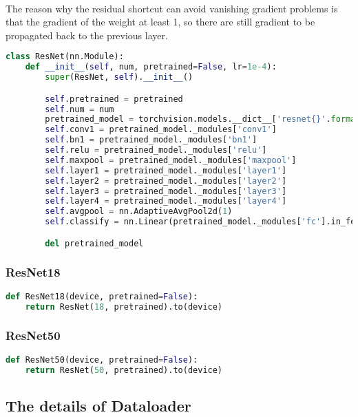 \paragraph{}
The reason why the residual shortcut can avoid vanishing gradient problems is that the gradient of the weight at least 1, so there are still gradient to be propagated back to the previous layer. 
\begin{lstlisting}[language=Python]
class ResNet(nn.Module):
    def __init__(self, num, pretrained=False, lr=1e-4):
        super(ResNet, self).__init__()

        self.pretrained = pretrained
        self.num = num
        pretrained_model = torchvision.models.__dict__['resnet{}'.format(num)](pretrained=pretrained)
        self.conv1 = pretrained_model._modules['conv1']
        self.bn1 = pretrained_model._modules['bn1']
        self.relu = pretrained_model._modules['relu']
        self.maxpool = pretrained_model._modules['maxpool']
        self.layer1 = pretrained_model._modules['layer1']
        self.layer2 = pretrained_model._modules['layer2']
        self.layer3 = pretrained_model._modules['layer3']
        self.layer4 = pretrained_model._modules['layer4']
        self.avgpool = nn.AdaptiveAvgPool2d(1)
        self.classify = nn.Linear(pretrained_model._modules['fc'].in_features, 5)

        del pretrained_model
\end{lstlisting}
\subsubsection{ResNet18}
\begin{lstlisting}[language=Python]
def ResNet18(device, pretrained=False):
    return ResNet(18, pretrained).to(device)
\end{lstlisting}
\subsubsection{ResNet50}
\begin{lstlisting}[language=Python]
def ResNet50(device, pretrained=False):
    return ResNet(50, pretrained).to(device)
\end{lstlisting}
\subsection{The details of Dataloader}
